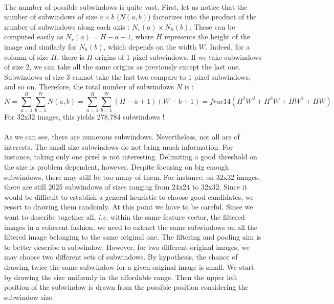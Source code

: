 \documentclass[a4paper]{report}
\begin{document}
		\paragraph{}
		The number of possible subwindows is quite vast. %
		First, let us notice that the number of subwindows of size $a \times b$ ($N(a,b)$) factorizes into the product of the number of subwindows along each axis : $N_v(a) \times N_h(b)$. These can be computed easily as $N_v(a) = H - a + 1$, where $H$ represents the height of the image and similarly for $N_h(b)$, which depends on the width $W$. Indeed, for a column of size $H$, there is $H$ origins of 1 pixel subwindows. If we take subwindows of size 2, we can take all the same origins as previously except the last one. Subwindows of size 3 cannot take the last two compare to 1 pixel subwindows, and so on.
		Therefore, the total number of subwindows $N$ is :
		\[
			N = \sum_{a=1}^H \sum_{b=1}^W N(a,b) = \sum_{a=1}^H \sum_{b=1}^W (H-a+1)(W-b+1) = frac{1}{4}(H^2W^2 + H^2 W + H W^2 + HW)
		\]
		For 32x32 images, this yields 278,784 subwindows !
		
		\paragraph{}
		As we can see, there are numerous subwindows. Nevertheless, not all are of interests. The small size subwindows do not bring much information. For instance, taking only one pixel is not interesting. Delimiting a good threshold on the size is problem dependent, however. Despite focusing on big enough subwindows, there may still be too many of them. For instance, on 32x32 images, there are still 2025 subwindows of sizes ranging from 24x24 to 32x32.
		Since it would be difficult to establish a general heuristic to choose good candidates, we resort to drawing them randomly. 
		At this point we have to be careful. Since we want to describe together all, \textit{i.e.} within the same feature vector, the filtered images in a coherent fashion, we need to extract the same subwindows on all the filtered image belonging to the same original one. The filtering and pooling aim is to better describe a subwindow. However, for two different original images, we may choose two different sets of subwindows.
		By hypothesis, the chance of drawing twice the same subwindow for a given original image is small.
		We start by drawing the size uniformly in the affordable range. Then the upper left position of the subwindow is drawn from the possible position considering the subwindow size.
		
\end{document}
